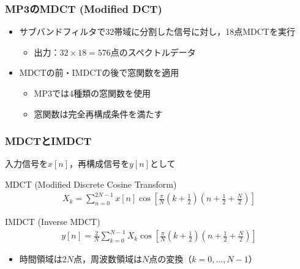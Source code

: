 \documentclass[14pt,xcolor=dvipsnames,table,dvipdfmx]{beamer}
\begin{document}
\begin{frame}[c]
    \frametitle{MP3のMDCT (Modified DCT)}
    \begin{itemize}
        \item サブバンドフィルタで32帯域に分割した信号に対し，18点MDCTを実行
            \begin{itemize}
                \item 出力：$32 \times 18 = 576$点のスペクトルデータ
            \end{itemize}
        \item MDCTの前・IMDCTの後で窓関数を適用
            \begin{itemize}
                \item MP3では4種類の窓関数を使用
                \item 窓関数は完全再構成条件を満たす
            \end{itemize}
    \end{itemize}
\end{frame}

\begin{frame}[c]
    \frametitle{MDCTとIMDCT}
    入力信号を$x[n]$，再構成信号を$y[n]$として
    \begin{block}{MDCT (Modified Discrete Cosine Transform)}
        \vspace{-15pt}
        \begin{align}
            X_{k} = \sum_{n = 0}^{2N - 1} x[n] \cos\left[ \frac{\pi}{N} \left( k + \frac{1}{2} \right) \left( n + \frac{1}{2} + \frac{N}{2} \right) \right] \label{eq:mdct}
        \end{align}
    \end{block}
    \begin{block}{IMDCT (Inverse MDCT)}
        \vspace{-15pt}
        \begin{align}
            y[n] = \frac{2}{N} \sum_{k = 0}^{N - 1} X_{k} \cos\left[ \frac{\pi}{N} \left( k + \frac{1}{2} \right) \left( n + \frac{1}{2} + \frac{N}{2} \right) \right] \label{eq:imdct}
        \end{align}
    \end{block}
    \begin{itemize}
        \item 時間領域は$2N$点，周波数領域は$N$点の変換（$k = 0, ..., N-1$）
    \end{itemize}
\end{frame}
\end{document}

